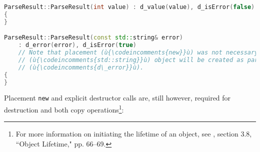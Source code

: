 %
\begin{lstlisting}[language=C++]
ParseResult::ParseResult(int value) : d_value(value), d_isError(false)
{
}

ParseResult::ParseResult(const std::string& error) 
    : d_error(error), d_isError(true)
    // Note that placement (ù{\codeincomments{new}}ù) was not necessary here because a new 
    // (ù{\codeincomments{std::string}}ù) object will be created as part of the initialization of 
    // (ù{\codeincomments{d\_error}}ù).
{
}
\end{lstlisting}

    
\noindent Placement \lstinline!new! and explicit destructor calls are, still however,
required for destruction and both copy operations{\cprotect\footnote{For
more information on initiating the lifetime of an object, see \cite{iso14}, section 3.8, ``Object Lifetime," pp. 66--69.}}:

